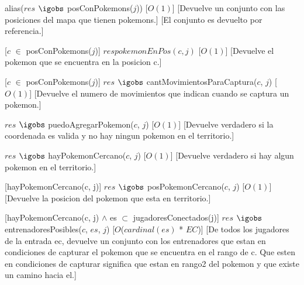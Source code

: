 \begin{Interfaz}
%
{alias($res$ $\igobs$ posConPokemons($j$))}%
[$O(1)$] %
[Devuelve un conjunto con las posiciones del mapa que tienen pokemons.]
[El conjunto es devuelto por referencia.]


%
[$c$ $\in$ posConPokemons($j$)]
{$res $\igobs$ pokemonEnPos(c, j)$}%
[$O(1)$] %
[Devuelve el pokemon que se encuentra en la posicion c.]


%
[$c$ $\in$ posConPokemons($j$)] %
{$res$ $\igobs$ cantMovimientosParaCaptura($c$, $j$)}%
[$O(1)$] %
[Devuelve el numero de movimientos que indican cuando se captura un pokemon.]



%
{$res$ $\igobs$ puedoAgregarPokemon($c$, $j$)}  %
[$O(1)$] 
[Devuelve verdadero si la coordenada es valida y no hay ningun pokemon en el territorio.]


%
{$res$ $\igobs$ hayPokemonCercano($c$, $j$)}  %
[$O(1)$] 
[Devuelve verdadero si hay algun pokemon en el territorio.]


%
[hayPokemonCercano(c, j)] 
{$res$ $\igobs$ posPokemonCercano($c$, $j$)}  %
[$O(1)$] 
[Devuelve la posicion del pokemon que esta en territorio.]



%
[hayPokemonCercano(c, j) $\land$ es $\subset$ jugadoresConectados(j)] 
{$res$ $\igobs$ entrenadoresPosibles($c$, $es$, $j$)}  %
[$O$($cardinal(es)$ * $EC$)] 
[De todos los jugadores de la entrada ec, devuelve un conjunto con los entrenadores que estan en condiciones de capturar el pokemon que se encuentra en el rango de c. Que esten en condiciones de capturar significa que estan en rango2 del pokemon y que existe un camino hacia el.]



\end{Interfaz}
